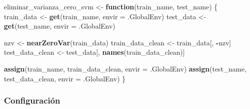 \documentclass[
]{article}
\newenvironment{Shaded}{\begin{snugshade}}{\end{snugshade}}
\newcommand{\AttributeTok}[1]{\textcolor[rgb]{0.13,0.29,0.53}{#1}}
\newcommand{\ControlFlowTok}[1]{\textcolor[rgb]{0.13,0.29,0.53}{\textbf{#1}}}
\newcommand{\FunctionTok}[1]{\textcolor[rgb]{0.13,0.29,0.53}{\textbf{#1}}}
\newcommand{\NormalTok}[1]{#1}
\newcommand{\OtherTok}[1]{\textcolor[rgb]{0.56,0.35,0.01}{#1}}
\newcommand{\SpecialCharTok}[1]{\textcolor[rgb]{0.81,0.36,0.00}{\textbf{#1}}}
\begin{document}
\begin{Shaded}
\begin{Highlighting}[]
\NormalTok{eliminar\_varianza\_cero\_svm }\OtherTok{\textless{}{-}} \ControlFlowTok{function}\NormalTok{(train\_name, test\_name) \{}
\NormalTok{  train\_data }\OtherTok{\textless{}{-}} \FunctionTok{get}\NormalTok{(train\_name, }\AttributeTok{envir =}\NormalTok{ .GlobalEnv)}
\NormalTok{  test\_data }\OtherTok{\textless{}{-}} \FunctionTok{get}\NormalTok{(test\_name, }\AttributeTok{envir =}\NormalTok{ .GlobalEnv)}
  
  
\NormalTok{  nzv }\OtherTok{\textless{}{-}} \FunctionTok{nearZeroVar}\NormalTok{(train\_data)}
\NormalTok{  train\_data\_clean }\OtherTok{\textless{}{-}}\NormalTok{ train\_data[, }\SpecialCharTok{{-}}\NormalTok{nzv]}
\NormalTok{  test\_data\_clean }\OtherTok{\textless{}{-}}\NormalTok{ test\_data[, }\FunctionTok{names}\NormalTok{(train\_data\_clean)]}
  
  \FunctionTok{assign}\NormalTok{(train\_name, train\_data\_clean, }\AttributeTok{envir =}\NormalTok{ .GlobalEnv)}
  \FunctionTok{assign}\NormalTok{(test\_name, test\_data\_clean, }\AttributeTok{envir =}\NormalTok{ .GlobalEnv)}
\NormalTok{\}}
\end{Highlighting}
\end{Shaded}

\hypertarget{configuraciuxf3n-1}{%
\subsubsection{Configuración}\label{configuraciuxf3n-1}}
\end{document}
